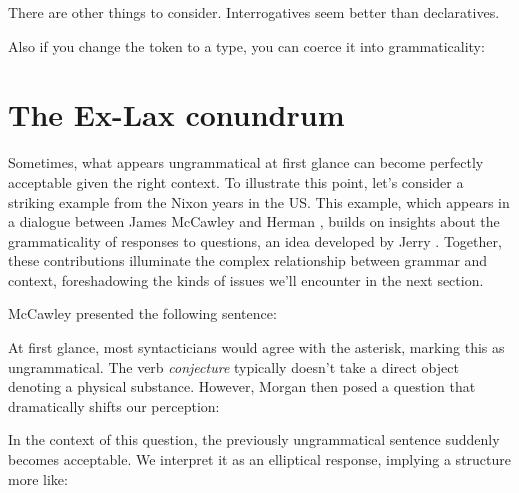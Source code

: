 There are other things to consider. Interrogatives seem better than declaratives.

\ea
    \z
\z

Also if you change the token to a type, you can coerce it into grammaticality:

\ea
    \z
\z

\section{The Ex-Lax conundrum}

Sometimes, what appears ungrammatical at first glance can become perfectly acceptable given the right context. To illustrate this point, let's consider a striking example from the Nixon years in the US. This example, which appears in a dialogue between James McCawley and Herman  \citet[252]{Parret1974}, builds on insights about the grammaticality of responses to questions, an idea developed by Jerry \citet{Morgan1973}. Together, these contributions illuminate the complex relationship between grammar and context, foreshadowing the kinds of issues we'll encounter in the next section.

McCawley presented the following sentence:

\label{ex:spiro-ex-lax}\z

At first glance, most syntacticians would agree with the asterisk, marking this as ungrammatical. The verb \textit{conjecture} typically doesn't take a direct object denoting a physical substance. However, Morgan then posed a question that dramatically shifts our perception:

\label{ex:pat-nixon-cakes}\z

In the context of this question, the previously ungrammatical sentence suddenly becomes acceptable. We interpret it as an elliptical response, implying a structure more like:

\label{ex:spiro-full}\z

